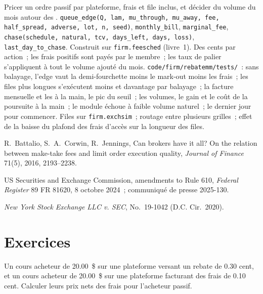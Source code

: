 \begin{build}
 Pricer un ordre passif par plateforme, frais et file inclus, et décider du volume du mois autour des .
 \texttt{queue\_edge(Q, lam, mu\_through, mu\_away, fee, half\_spread, adverse, lot, n, seed)}, \texttt{monthly\_bill},
\texttt{marginal\_fee}, \texttt{chase(schedule, natural, tcv, days\_left, days, loss)}, \texttt{last\_day\_to\_chase}. Construit sur
\texttt{firm.feesched} (livre~1).
 Des cents par action~; les frais positifs sont payés par le membre~; les taux de palier s'appliquent à tout le volume ajouté du mois.
 \texttt{code/firm/rebatemm/tests/}~: sans balayage, l'edge vaut la demi-fourchette moins le mark-out moins les frais~; les files plus longues
s'exécutent moins et davantage par balayage~; la facture mensuelle et les  à la main, le pic du seuil~; les volumes, le gain et le coût de la poursuite à la main~; le module
échoue à faible volume naturel~; le dernier jour pour commencer.
 Files sur \texttt{firm.exchsim}~; routage entre plusieurs grilles~; effet de la baisse du plafond des frais d'accès sur la longueur des files.
\end{build}

\begin{omsources}
\item R.~Battalio, S.~A.~Corwin, R.~Jennings, Can brokers have it all? On the relation between make-take fees and limit order execution quality,
\emph{Journal of Finance} 71(5), 2016, 2193--2238.
\item US Securities and Exchange Commission, amendments to Rule 610, \emph{Federal Register} 89 FR 81620, 8 octobre 2024~; communiqué de presse 2025-130.
\item \emph{New York Stock Exchange LLC v. SEC}, No.\ 19-1042 (D.C. Cir.\ 2020).
\end{omsources}

\section{Exercices}

\begin{exercise}[$\star$]\label{exo:hf:rebates-inverted-venues-and-tiers:1}
Un cours acheteur de 20.00~\$ sur une plateforme versant un rebate de 0.30 cent, et un cours acheteur de 20.00~\$ sur une plateforme facturant des frais de 0.10 cent. Calculer leurs
prix nets des frais pour l'acheteur passif.
\end{exercise}

